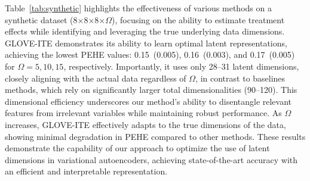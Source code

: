 \documentclass[doubleblind]{ecai}
\begin{document}
	

	

	
	Table~\ref{tab:synthetic} highlights the effectiveness of various methods on a synthetic dataset (8$\times$8$\times$8$\times\Omega$), focusing on the ability to estimate treatment effects while identifying and leveraging the true underlying data dimensions. GLOVE-ITE demonstrates its ability to learn optimal latent representations, achieving the lowest PEHE values: 0.15~(0.005), 0.16~(0.003), and 0.17~(0.005) for $\Omega=5,10,15$, respectively. Importantly, it uses only 28--31 latent dimensions, closely aligning with the actual data regardless of $\Omega$, in contrast to baselines methods, which rely on significantly larger total dimensionalities (90--120). This dimensional efficiency underscores our method’s ability to disentangle relevant features from irrelevant variables while maintaining robust performance. As $\Omega$ increases, GLOVE-ITE effectively adapts to the true dimensions of the data, showing minimal degradation in PEHE compared to other methods. These results demonstrate the capability of our approach to optimize the use of latent dimensions in variational autoencoders, achieving state-of-the-art accuracy with an efficient and interpretable representation.
	
\end{document}
